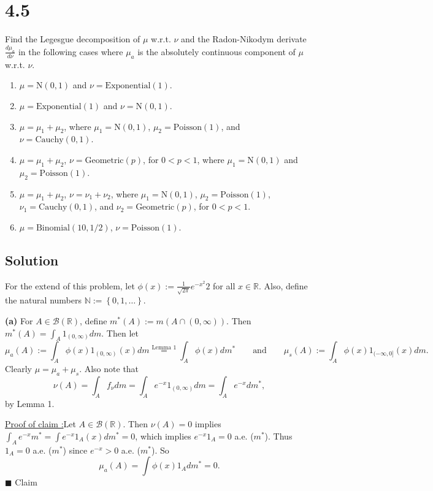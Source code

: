 \documentclass[12pt]{article}
\newcounter{ProofCounter}
\newcounter{ClaimCounter}[ProofCounter]
\newenvironment{claim}[1]{\stepcounter{ClaimCounter}\par\noindent\underline{Claim \theClaimCounter:}\space#1}{}
\newenvironment{claimproof}[1]{\par\noindent\underline{Proof of claim \theClaimCounter:}\space#1}{\hfill $\blacksquare$ Claim \theClaimCounter\vspace{5mm}}
\begin{document}
\newpage 
\section*{4.5}
Find the Legesgue decomposition of $\mu$ w.r.t. $\nu$ and the Radon-Nikodym derivate $\frac{d\mu_{a}}{d\nu}$ in the following cases where $\mu_{a}$ is
the absolutely continuous component of $\mu$ w.r.t. $\nu$.
\begin{enumerate}[label=(\alph*)]
\item $\mu = \text{N}(0,1)$ and $\nu = \text{Exponential}(1)$.
\item $\mu = \text{Exponential}(1)$ and $\nu = \text{N}(0,1)$.
\item $\mu = \mu_{1} + \mu_{2}$, where $\mu_{1} = \text{N}(0,1)$, $\mu_{2} = \text{Poisson}(1)$, and $\nu = \text{Cauchy}(0,1)$.
\item $\mu = \mu_{1} + \mu_{2}$, $\nu = \text{Geometric}(p)$, for $0 < p < 1$, where $\mu_{1} = \text{N}(0,1)$ and $\mu_{2} = \text{Poisson}(1)$.
\item $\mu = \mu_{1} + \mu_{2}$, $\nu = \nu_{1} + \nu_{2}$, where $\mu_{1} = \text{N}(0,1)$, $\mu_{2} = \text{Poisson}(1)$, $\nu_{1} =
\text{Cauchy}(0,1)$, and $\nu_{2} = \text{Geometric}(p)$, for $0 < p < 1$.
\item $\mu = \text{Binomial}(10, 1/2)$, $\nu = \text{Poisson}(1)$.
\end{enumerate}

\subsection*{Solution}
For the extend of this problem, let $\phi(x) := \frac{1}{\sqrt{2\pi}}e^{-x^{2}}{2}$ for all $x \in \mathbb{R}$. Also, define the natural numbers
$\mathbb{N} := \left\{ 0, 1, \hdots \right\}$.

{\bf (a)}
For $A \in \mathcal{B}(\mathbb{R})$, define $m^{*}(A) := m(A\cap (0,\infty))$. Then $m^{*}(A) = \int_{A}1_{(0,\infty)}dm$. Then let
\[ \mu_{a}(A) := \int_{A}\phi(x)1_{(0,\infty)}(x)dm \stackrel{\text{Lemma 1}}{=} \int_{A}\phi(x)dm^{*} \qquad \text{and} \qquad \mu_{s}(A) := \int_{A}\phi(x)1_{(-\infty,0]}(x)dm. \]
Clearly $\mu = \mu_{a} + \mu_s$. Also note that 
\[ \nu(A) = \int_{A}f_{\nu}dm = \int_{A}e^{-x}1_{(0,\infty)}dm = \int_{A}e^{-x}dm^{*},\]  
by Lemma 1.
\begin{claimproof}
Let $A \in \mathcal{B}(\mathbb{R})$. Then $\nu(A) = 0$ implies $\int_{A}e^{-x}m^{*} = \int e^{-x}1_{A}(x)dm^{*} = 0$,
which implies $e^{-x}1_{A} = 0$ a.e. ($m^{*}$). Thus $1_{A} = 0$ a.e. ($m^*$) since $e^{-x} > 0$ a.e. ($m^*$). So 
\[ \mu_{a}(A) = \int \phi(x)1_{A}dm^{*} = 0. \]
\end{claimproof}
\end{document}
